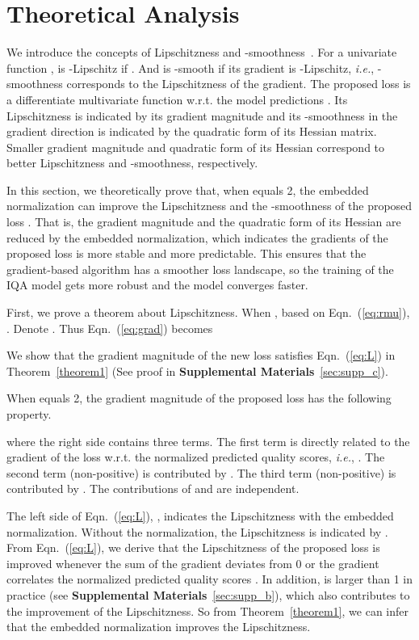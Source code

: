 \documentclass[sigconf]{acmart}
\begin{document}
\section{Theoretical Analysis}
We introduce the concepts of Lipschitzness and -smoothness~\cite{nesterov2013introductory}. 
For a univariate function ,  is -Lipschitz if . 
And  is -smooth if its gradient is -Lipschitz, \textit{i.e.}, -smoothness corresponds to the Lipschitzness of the gradient. 
The proposed loss  is a differentiate multivariate function w.r.t. the model predictions .
Its Lipschitzness is indicated by its gradient magnitude and its -smoothness in the gradient direction is indicated by the quadratic form of its Hessian matrix. 
Smaller gradient magnitude and quadratic form of its Hessian correspond to better Lipschitzness and -smoothness, respectively.

In this section, we theoretically prove that, when  equals 2, the embedded normalization can improve the Lipschitzness and the -smoothness of the proposed loss . That is, the gradient magnitude and the quadratic form of its Hessian are reduced by the embedded normalization, which indicates the gradients of the proposed loss is more stable and more predictable.
This ensures that the gradient-based algorithm has a smoother loss landscape, so the training of the IQA model gets more robust and the model converges faster.

First, we prove a theorem about Lipschitzness. 
When , based on Eqn.~(\ref{eq:rmu}), . 
Denote . 
Thus Eqn.~(\ref{eq:grad}) becomes


We show that the gradient magnitude of the new loss satisfies Eqn.~(\ref{eq:L}) in Theorem~\ref{theorem1} (See proof in \textbf{Supplemental Materials}~\ref{sec:supp_c}). 

\begin{theorem}[Lipschitzness]\label{theorem1}
When  equals 2, the gradient magnitude of the proposed loss  has the following property.

where the right side contains three terms. 
The first term is directly related to the gradient of the loss w.r.t. the normalized predicted quality scores, \textit{i.e.}, . 
The second term (non-positive) is contributed by . 
The third term (non-positive) is contributed by . 
The contributions of  and  are independent.
\end{theorem}

The left side of Eqn.~(\ref{eq:L}), , indicates the Lipschitzness with the embedded normalization. 
Without the normalization, the Lipschitzness is indicated by . 
From Eqn.~(\ref{eq:L}), we derive that the Lipschitzness of the proposed loss is improved whenever the sum of the gradient  deviates from 0 or the gradient  correlates the normalized predicted quality scores . 
In addition,  is larger than 1 in practice (see \textbf{Supplemental Materials}~\ref{sec:supp_b}), which also contributes to the improvement of the Lipschitzness. 
So from Theorem~\ref{theorem1}, we can infer that the embedded normalization improves the Lipschitzness.
\end{document}

